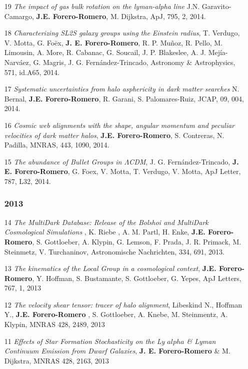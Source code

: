 \documentclass[a4paper,10pt]{article} %
\begin{document}
\begin{enumerate}
\item[19]{\it The impact of gas bulk rotation on the lyman-alpha line}
  J.N. Garavito-Camargo,  {\bf J.E. Forero-Romero}, M. Dijkstra, ApJ,
  795, 2, 2014. 
 

\item[18]{\it  Characterizing SL2S galaxy groups using the Einstein
  radius}, T. Verdugo, V. Motta, G. Fo\"ex, {\bf J. E. Forero-Romero},
  R. P. Mu\~noz, R. Pello, M. Limousin, A. More, R. Cabanac, G. Soucail,
  J. P. Blakeslee, A. J. Mej\'ia-Narv\'aez, G. Magris,
  J. G. Fern\'andez-Trincado, Astronomy \& Astrophysics, 571, id.A65, 2014.


\item[17]{\it Systematic uncertainties from halo asphericity in dark
  matter searches}  N. Bernal, {\bf J.E. Forero-Romero}, R. Garani,
  S. Palomares-Ruiz, JCAP, 09, 004, 2014.

\item[16]{\it Cosmic web alignments with the shape, angular momentum
  and peculiar velocities of dark matter halos}, 
  {\bf J.E. Forero-Romero}, S. Contreras, N. Padilla, MNRAS, 443,
  1090, 2014. 

\item[15]{\it The abundance of Bullet Groups in $\Lambda$CDM},
  J. G. Fern\'andez-Trincado, {\bf J. E. Forero-Romero}, G. Foex,
  V. Motta, T. Verdugo, V. Motta, ApJ Letter, 787, L32, 2014.

\subsubsection{2013}
\item[14]{\it The MultiDark Database: Release of the Bolshoi and
  MultiDark Cosmological Simulations} , K. Riebe , A. M. Partl,
  H. Enke, {\bf J.E. Forero-Romero}, S. Gottloeber, A. Klypin,
  G. Lemson, F. Prada, J. R. Primack, M. Steinmetz, V. Turchaninov,
  Astronomische Nachrichten, 334, 691, 2013. 

\item[13] {\it The kinematics of the Local Group in a cosmological context}, 
{\bf J.E. Forero-Romero}, Y. Hoffman, S. Bustamante, S. Gottloeber,
G. Yepes, ApJ Letters, 767, 1, 2013 

\item[12] {\it The velocity shear tensor: tracer of halo alignment},
  Libeskind N., Hoffman Y., {\bf J.E. Forero-Romero} , S. Gottloeber,
  A. Knebe, M. Steinmentz, A. Klypin, MNRAS 428, 2489, 2013 

\item[11] {\it Effects of Star Formation Stochasticity on the Ly
  $alpha$ \& Lyman Continuum Emission from Dwarf Galaxies}, {\bf
  J. E. Forero-Romero} \& M. Dijkstra, MNRAS 428, 2163, 2013 


\end{enumerate}
\end{document}
